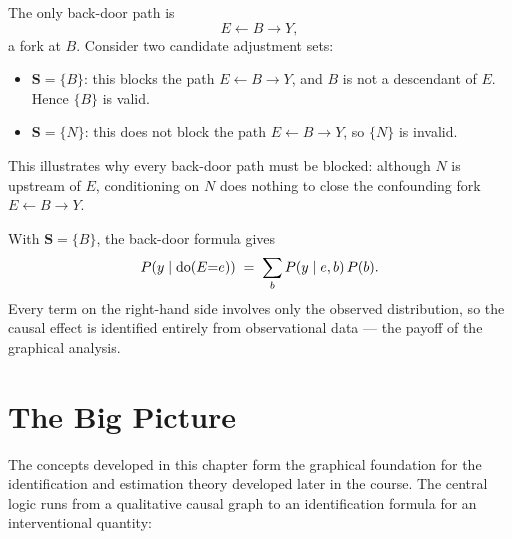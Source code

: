 \documentclass[master.tex]{subfiles}
\begin{document}
The only back-door path is
\[
  E \leftarrow B \to Y,
\]
a fork at $B$.
Consider two candidate adjustment sets:
\begin{itemize}
  \item $\mathbf{S} = \{B\}$: this blocks the path $E \leftarrow B \to Y$,
        and $B$ is not a descendant of $E$.
        Hence $\{B\}$ is valid.
  \item $\mathbf{S} = \{N\}$: this does not block the path
        $E \leftarrow B \to Y$, so $\{N\}$ is invalid.
\end{itemize}
This illustrates why every back-door path must be blocked: although $N$
is upstream of $E$, conditioning on $N$ does nothing to close the
confounding fork $E \leftarrow B \to Y$.

With $\mathbf{S} = \{B\}$, the back-door formula gives
\[
  P(y \mid \mathrm{do}(E{=}e))
  \;=\; \sum_{b} P(y \mid e, b)\,P(b).
\]
Every term on the right-hand side involves only the observed distribution,
so the causal effect is identified entirely from observational data ---
the payoff of the graphical analysis.

\section{The Big Picture}

The concepts developed in this chapter form the graphical foundation for
the identification and estimation theory developed later in the course.
The central logic runs from a qualitative causal graph to an identification
formula for an interventional quantity:
\end{document}
